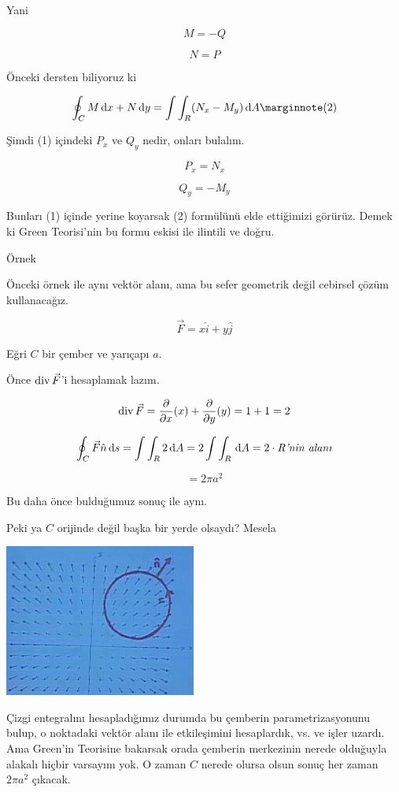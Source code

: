 \documentclass[12pt,fleqn]{article}\usepackage{../../common}
\begin{document}
Yani 

$$ M = -Q $$

$$ N = P $$

Önceki dersten biliyoruz ki 

$$
\oint_C M \ud x + N \ud y = \int \int_R (N_x - M_y) \ud A 
\mlabel{2}
$$

Şimdi (1) içindeki $P_x$ ve $Q_y$ nedir, onları bulalım. 

$$ P_x = N_x $$

$$ Q_y = -M_y $$

Bunları (1) içinde yerine koyarsak (2) formülünü elde ettiğimizi görürüz. Demek
ki Green Teorisi'nin bu formu eskisi ile ilintili ve doğru.

Örnek

Önceki örnek ile aynı vektör alanı, ama bu sefer geometrik değil cebirsel
çözüm kullanacağız. 

$$ \vec{F} = x\hat{i} + y\hat{j} $$

Eğri $C$ bir çember ve yarıçapı $a$. 

Önce $\operatorname{div} \vec{F}$'i hesaplamak lazım. 

$$ \operatorname{div} \vec{F}  = 
\frac{\partial }{\partial x}(x) + 
\frac{\partial }{\partial y}(y) = 
1 + 1 = 2 
 $$

$$
\oint_C \vec{F} \hat{n} \,\mathrm{d} s = 
\int \int_R 2 \,\mathrm{d} A = 2 \int \int_R \,\mathrm{d} A = 
2 \cdot \textit{R'nin alanı}
$$

$$ = 2\pi a^2 $$

Bu daha önce bulduğumuz sonuç ile aynı.

Peki ya $C$ orijinde değil başka bir yerde olsaydı? Mesela 

\includegraphics[height=5cm]{23_9.png}

Çizgi entegralını hesapladığımız durumda bu çemberin parametrizasyonunu
bulup, o noktadaki vektör alanı ile etkileşimini hesaplardık, vs. ve işler
uzardı. Ama Green'in Teorisine bakarsak orada çemberin merkezinin nerede
olduğuyla alakalı hiçbir varsayım yok. O zaman $C$ nerede olursa olsun
sonuç her zaman $2\pi a^2$ çıkacak. 
\end{document}
